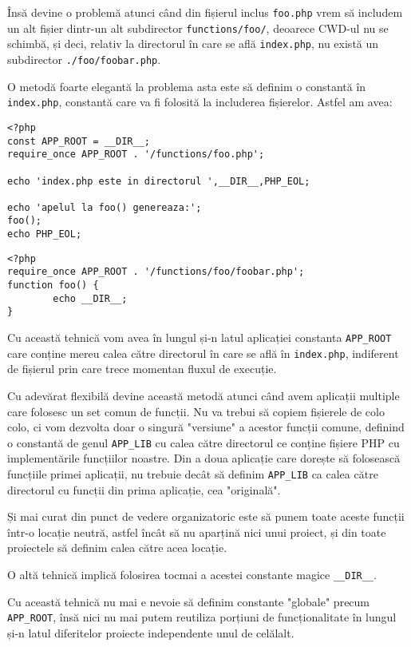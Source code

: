 Însă devine o problemă atunci când din fișierul
inclus \texttt{foo.php} vrem să includem
un alt fișier dintr-un alt subdirector
\texttt{functions/foo/}, deoarece CWD-ul nu se
schimbă, și deci, relativ la directorul
în care se află \texttt{index.php}, nu există
un subdirector \texttt{./foo/foobar.php}.

O metodă foarte elegantă la problema asta este să definim
o constantă în \texttt{index.php}, constantă care
va fi folosită la includerea fișierelor. Astfel am
avea:

\begin{lstlisting}[title=index.php]
<?php
const APP_ROOT = __DIR__;
require_once APP_ROOT . '/functions/foo.php';

echo 'index.php este in directorul ',__DIR__,PHP_EOL;

echo 'apelul la foo() genereaza:';
foo();
echo PHP_EOL;
\end{lstlisting}

\begin{lstlisting}[title=functions/foo.php]
<?php
require_once APP_ROOT . '/functions/foo/foobar.php';
function foo() {
        echo __DIR__;
}
\end{lstlisting}
Cu această tehnică vom avea în lungul și-n latul
aplicației constanta \texttt{APP\_ROOT} care
conține mereu calea către directorul în
care se află în \texttt{index.php}, indiferent
de fișierul prin care trece momentan fluxul
de execuție.

Cu adevărat flexibilă devine această metodă
atunci când avem aplicații multiple care
folosesc un set comun de funcții. Nu va trebui
să copiem fișierele de colo colo, ci vom
dezvolta doar o singură "versiune" a acestor
funcții comune, definind o constantă 
de genul \texttt{APP\_LIB} cu calea către
directorul ce conține fișiere PHP
cu implementările funcțiilor noastre. Din a doua aplicație
care dorește să folosească funcțiile primei
aplicații, nu trebuie decât să definim
\texttt{APP\_LIB} ca calea către
directorul cu funcții din prima aplicație,
cea "originală".

Și mai curat din punct de vedere organizatoric
este să punem toate aceste funcții într-o
locație neutră, astfel încât să nu aparțină
nici unui proiect, și din toate
proiectele să definim calea către acea
locație.

O altă tehnică implică folosirea tocmai
a acestei constante magice  \texttt{\_\_DIR\_\_}.

Cu această tehnică nu mai e nevoie
să definim constante "globale" precum \texttt{APP\_ROOT},
însă nici nu mai putem reutiliza porțiuni
de funcționalitate în lungul și-n latul
diferitelor proiecte independente unul de celălalt.

